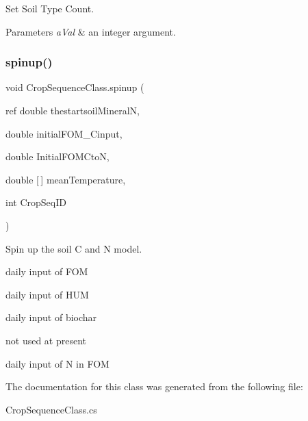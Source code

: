 Set Soil Type Count. 


\begin{DoxyParams}{Parameters}
{\em a\+Val} & an integer argument. \\
\hline
\end{DoxyParams}
\mbox{\label{class_crop_sequence_class_ae05480cc30f8329951f9cb63ecb6ced5}} 
\subsubsection{\texorpdfstring{spinup()}{spinup()}}
{\footnotesize\ttfamily void Crop\+Sequence\+Class.\+spinup (\begin{DoxyParamCaption}\item[{ref double}]{thestartsoil\+MineralN,  }\item[{double}]{initial\+F\+O\+M\+\_\+\+Cinput,  }\item[{double}]{Initial\+F\+O\+M\+CtoN,  }\item[{double \mbox{[}$\,$\mbox{]}}]{mean\+Temperature,  }\item[{int}]{Crop\+Seq\+ID }\end{DoxyParamCaption})\hspace{0.3cm}{\ttfamily [inline]}}



Spin up the soil C and N model. 

daily input of F\+OM

daily input of H\+UM

daily input of biochar

not used at present

daily input of N in F\+OM 

The documentation for this class was generated from the following file\+:\begin{DoxyCompactItemize}
\item 
Crop\+Sequence\+Class.\+cs\end{DoxyCompactItemize}
